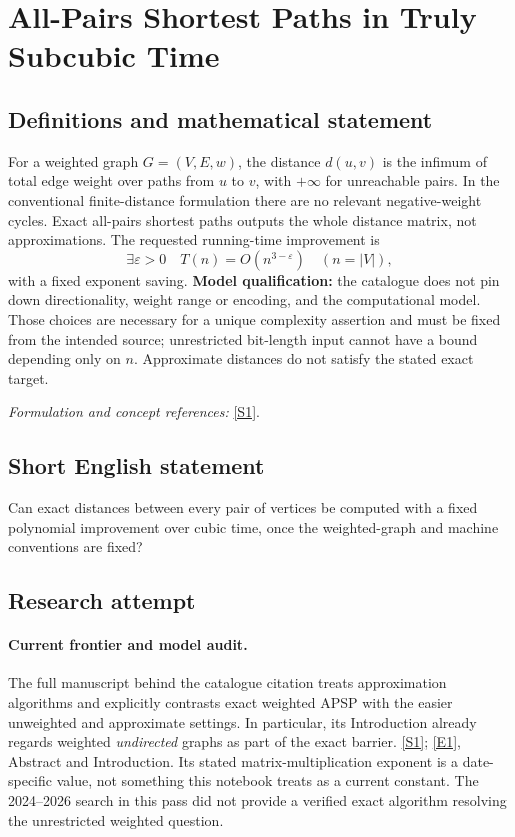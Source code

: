 \documentclass[11pt,a4paper]{article}
\newcommand{\eps}{\varepsilon}
\newcommand{\sref}[2]{\hyperlink{source:#1:#2}{[S#2]}}
\newcommand{\eref}[2]{\hyperlink{extra:#1:#2}{[E#2]}}
\newif\ifshowcatalogue
\newcommand{\cataloguescope}[1]{\ifshowcatalogue
 \paragraph{Exact scope in the supplied catalogue.}
 \begin{quote}\small #1\end{quote}\fi}
\numberwithin{equation}{section}
\begin{document}
\setcounter{section}{0}
\clearpage
\section*{\texorpdfstring{All-Pairs Shortest Paths in Truly Subcubic Time}{All-Pairs Shortest Paths in Truly Subcubic Time}}\label{statement}
\subsection{Definitions and mathematical statement}
For a weighted graph $G=(V,E,w)$, the distance $d(u,v)$ is the infimum of total edge weight over paths from $u$ to $v$, with $+\infty$ for unreachable pairs. In the conventional finite-distance formulation there are no relevant negative-weight cycles. Exact all-pairs shortest paths outputs the whole distance matrix, not approximations. The requested running-time improvement is
\[
 \exists\eps>0\quad T(n)=O(n^{3-\eps})\quad(n=|V|),
\]
with a fixed exponent saving. \textbf{Model qualification:} the catalogue does not pin down directionality, weight range or encoding, and the computational model. Those choices are necessary for a unique complexity assertion and must be fixed from the intended source; unrestricted bit-length input cannot have a bound depending only on $n$. Approximate distances do not satisfy the stated exact target.
\par\smallskip\textit{Formulation and concept references:} \sref{statement}{1}.
\cataloguescope{Determine whether exact all-pairs shortest paths on weighted n-vertex graphs can be computed in O(n\textasciicircum{}(3-epsilon)) time for some fixed epsilon greater than zero.}
\subsection{Short English statement}
Can exact distances between every pair of vertices be computed with a fixed polynomial improvement over cubic time, once the weighted-graph and machine conventions are fixed?
\subsection{Research attempt}

\paragraph{Current frontier and model audit.}
The full manuscript behind the catalogue citation treats approximation
algorithms and explicitly contrasts exact weighted APSP with the easier
unweighted and approximate settings. In particular, its Introduction
already regards weighted \emph{undirected} graphs as part of the exact
barrier. \sref{statement}{1}; \eref{statement}{1}, Abstract and Introduction.
Its stated matrix-multiplication exponent is a date-specific value, not
something this notebook treats as a current constant. The 2024--2026
search in this pass did not provide a verified exact algorithm resolving
the unrestricted weighted question.
\end{document}
